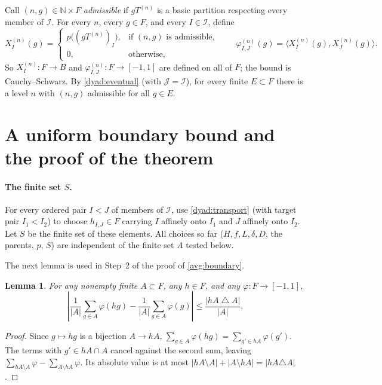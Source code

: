 \documentclass[11pt]{article}
\newcommand{\N}{\mathbb N}
\newcommand{\ip}[2]{\langle #1,#2\rangle}
\newtheorem{lemma}[theorem]{Lemma}
\theoremstyle{definition}
\numberwithin{equation}{section}
\begin{document}
Call \((n,g)\in\N\times F\) \emph{admissible} if \(gT^{(n)}\) is a basic
partition respecting every member of \(\mathcal I\). For every \(n\), every
\(g\in F\), and every \(I\in\mathcal I\), define
\begin{equation}\label{color:global}
  X_I^{(n)}(g)=
  \begin{cases}
    p\bigl((gT^{(n)})_I\bigr),&\text{if \((n,g)\) is admissible},\\
    0,&\text{otherwise},
  \end{cases}
  \qquad
  \varphi_{I,J}^{(n)}(g)=\ip{X_I^{(n)}(g)}{X_J^{(n)}(g)}.
\end{equation}
So \(X_I^{(n)}:F\to B\) and \(\varphi^{(n)}_{I,J}:F\to[-1,1]\) are defined
on all of \(F\); the bound is Cauchy--Schwarz. By \cref{dyad:eventual}
(with \(\mathcal J=\mathcal I\)), for every finite \(E\subset F\) there is
a level \(n\) with \((n,g)\) admissible for all \(g\in E\).

\section{A uniform boundary bound and the proof of the theorem}
\label{sec:boundary}

\paragraph{The finite set \(S\).}
For every ordered pair \(I<J\) of members of \(\mathcal I\), use
\cref{dyad:transport} (with target pair \(I_1<I_2\)) to choose
\(h_{I,J}\in F\) carrying \(I\) affinely onto \(I_1\) and \(J\) affinely
onto \(I_2\). Let \(S\) be the finite set of these elements.
All choices so far (\(H,f,L,\delta,D\), the parents, \(p\), \(S\)) are
independent of the finite set \(A\) tested below.

The next lemma is used in Step~2 of the proof of \cref{avg:boundary}.

\begin{lemma}\label{avg:translation}
For any nonempty finite \(A\subset F\), any \(h\in F\), and any
\(\varphi:F\to[-1,1]\),
\begin{equation}\label{eq:finite-translation}
 \left|\frac1{|A|}\sum_{g\in A}\varphi(hg)
       -\frac1{|A|}\sum_{g\in A}\varphi(g)\right|
 \le\frac{|hA\mathbin{\triangle}A|}{|A|}.
\end{equation}
\end{lemma}

\begin{proof}
Since \(g\mapsto hg\) is a bijection \(A\to hA\),
\(\sum_{g\in A}\varphi(hg)=\sum_{g'\in hA}\varphi(g')\). The terms with
\(g'\in hA\cap A\) cancel against the second sum, leaving
\(\sum_{hA\setminus A}\varphi-\sum_{A\setminus hA}\varphi\). Its absolute
value is at most \(|hA\setminus A|+|A\setminus hA|=|hA\triangle A|\).
\end{proof}
\end{document}
